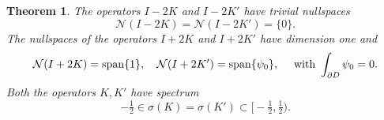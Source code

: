 \documentclass[10pt, a4paper, twoside, openright]{book}
\theoremstyle{definition}
\theoremstyle{plain}
\newtheorem{theorem}[subsection]{Theorem}
\theoremstyle{plain}
\theoremstyle{plain}
\theoremstyle{plain}
\theoremstyle{plain}
\theoremstyle{plain}
\theoremstyle{plain}
\theoremstyle{plain}
\begin{document}
\begin{theorem}
\label{theo:K-nullspace}
 The operators $I-2K$ and $I-2K'$ have trivial nullspaces
 \begin{equation}
  \mathcal{N}(I-2K)=\mathcal{N}(I-2K')=\{0\}.
 \end{equation}
 The nullspaces of the operators $I+2K$ and $I+2K'$ have dimension one and
 \begin{equation}
  \mathcal{N}(I+2K)=\textup{span}\{1\}, \quad \mathcal{N}(I+2K')=\textup{span}\{\psi_0\}, \quad\textup{ with }\int_{\partial D}\psi_0=0.
 \end{equation}
 Both the operators $K,K'$ have spectrum
 \begin{equation}
 \label{eq:K-spectrum}
  -\tfrac{1}{2}\in\sigma(K)=\sigma(K')\subset \bigl[-\tfrac{1}{2}, \tfrac{1}{2}\bigr).
 \end{equation}
\end{theorem}
\end{document}
